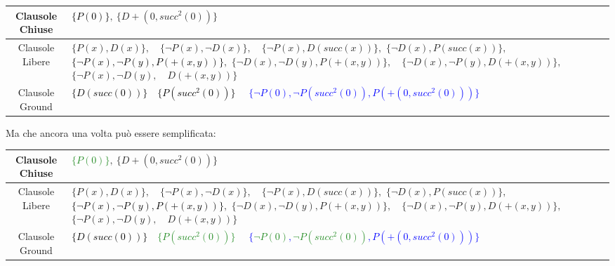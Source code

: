 \documentclass[a4paper,10pt]{article}
\begin{document}
\begin{table}[H]
    \centering
    \small 
    \renewcommand{\arraystretch}{1.5} 
    
    \begin{tabularx}{\textwidth}{|c|>{\centering\arraybackslash}X|}
        \hline
        Clausole Chiuse & \textcolor{black}{$\{P(0)\}$}$, \ \{D+(0,succ^2(0))\}$ \\
        \hline
        Clausole Libere & 
            $\{P(x), D(x)\},\quad \{\lnot P(x), \lnot D(x)\},\quad \{\lnot P(x), D(succ(x))\},$\newline
            $\{\lnot D(x), P(succ(x))\},\quad $\textcolor{black}{$\{\lnot P(x), \lnot P(y), P(+(x, y))\}$}$,$\newline
            $\{\lnot D(x), \lnot D(y), P(+(x, y))\},\quad \{\lnot D(x), \lnot P(y), D(+(x, y))\},$\newline
            $\{\lnot P(x), \lnot D(y),\quad D(+(x, y))\}$ 
            \\
        \hline
        Clausole Ground & \textcolor{black}{$\{D(succ(0))\}\quad$}\textcolor{black}{$\{P(succ^2(0))\}\quad$}
        \textcolor{blue}{$\{\lnot P(0), \lnot P(succ^2(0)), P(+(0, succ^2(0)))\}$}
        \\
        \hline
    \end{tabularx}
\end{table}

Ma che ancora una volta può essere semplificata:

\begin{table}[H]
    \centering
    \small 
    \renewcommand{\arraystretch}{1.5} 
    
    \begin{tabularx}{\textwidth}{|c|>{\centering\arraybackslash}X|}
        \hline
        Clausole Chiuse & \textcolor{ForestGreen}{$\{P(0)\}$}$, \ \{D+(0,succ^2(0))\}$ \\
        \hline
        Clausole Libere & 
            $\{P(x), D(x)\},\quad \{\lnot P(x), \lnot D(x)\},\quad \{\lnot P(x), D(succ(x))\},$\newline
            $\{\lnot D(x), P(succ(x))\},\quad $\textcolor{black}{$\{\lnot P(x), \lnot P(y), P(+(x, y))\}$}$,$\newline
            $\{\lnot D(x), \lnot D(y), P(+(x, y))\},\quad \{\lnot D(x), \lnot P(y), D(+(x, y))\},$\newline
            $\{\lnot P(x), \lnot D(y),\quad D(+(x, y))\}$ 
            \\
        \hline
        Clausole Ground & \textcolor{black}{$\{D(succ(0))\}\quad$}\textcolor{ForestGreen}{$\{P(succ^2(0))\}\quad$}
        \textcolor{blue}{$\{$\sout{\textcolor{ForestGreen}{$\lnot P(0)$}}$, $\sout{\textcolor{ForestGreen}{$\lnot P(succ^2(0))$}}$, P(+(0, succ^2(0)))\}$}
        \\
        \hline
    \end{tabularx}
\end{table}
\end{document}

